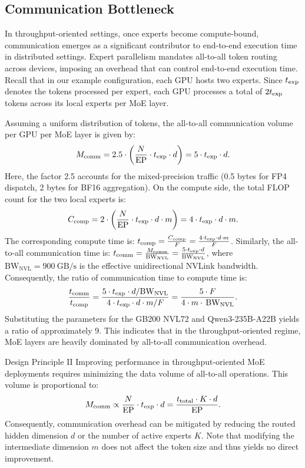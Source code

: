 \subsection{Communication Bottleneck}
In throughput-oriented settings, once experts become compute-bound, communication emerges as a significant contributor to end-to-end execution time in distributed settings. Expert parallelism mandates all-to-all token routing across devices, imposing an overhead that can control end-to-end execution time.
Recall that in our example configuration, each GPU hosts two experts. Since $t_\mathrm{exp}$ denotes the tokens processed per expert, each GPU processes a total of $2 t_\mathrm{exp}$ tokens across its local experts per MoE layer.

Assuming a uniform distribution of tokens, the all-to-all communication volume per GPU per MoE layer is given by:
\begin{equation*}
M_{\mathrm{comm}} = 2.5 \cdot \left( \frac{N}{\mathrm{EP}} \cdot t_\mathrm{exp} \cdot d \right) = 5 \cdot t_\mathrm{exp} \cdot d.
\end{equation*}
Here, the factor 2.5 accounts for the mixed-precision traffic (0.5 bytes for FP4 dispatch, 2 bytes for BF16 aggregation). On the compute side, the total FLOP count for the two local experts is:
\begin{equation*}
C_{\mathrm{comp}} = 2 \cdot \left( \frac{N}{\mathrm{EP}} \cdot t_\mathrm{exp} \cdot d \cdot m \right) = 4 \cdot t_\mathrm{exp} \cdot d \cdot m.
\end{equation*}
The corresponding compute time is: $t_{\mathrm{comp}} = \frac{C_{\mathrm{comp}}}{F} = \frac{4 \cdot t_\mathrm{exp} \cdot d \cdot m}{F}$. Similarly, the all-to-all communication time is:
$t_{\mathrm{comm}} = \frac{M_{\mathrm{comm}}}{\mathrm{BW}_{\mathrm{NVL}}} = \frac{5 \cdot t_\mathrm{exp} \cdot d}{\mathrm{BW}_{\mathrm{NVL}}}$,
where $\mathrm{BW}_{\mathrm{NVL}} = 900~\text{GB/s}$ is the effective unidirectional NVLink bandwidth. Consequently, the ratio of communication time to compute time is:
\begin{equation*}
\frac{t_{\mathrm{comm}}}{t_{\mathrm{comp}}} = \frac{5 \cdot t_\mathrm{exp} \cdot d / \mathrm{BW}_{\mathrm{NVL}}}{4 \cdot t_\mathrm{exp} \cdot d \cdot m / F} = \frac{5 \cdot F}{4 \cdot m \cdot \, \mathrm{BW}_{\mathrm{NVL}}}.
\end{equation*}
Substituting the parameters for the GB200 NVL72 and Qwen3-235B-A22B yields a ratio of approximately 9. This indicates that in the throughput-oriented regime, MoE layers are heavily dominated by all-to-all communication overhead.

\begin{notebox}{Design Principle II}
Improving performance in throughput-oriented MoE deployments requires minimizing the data volume of all-to-all operations. This volume is proportional to:
\begin{equation*}
M_{\mathrm{comm}} \propto \frac{N}{\mathrm{EP}} \cdot t_\mathrm{exp} \cdot d = \frac{t_\mathrm{total} \cdot K \cdot d}{\mathrm{EP}}.
\end{equation*}
Consequently, communication overhead can be mitigated by reducing the routed hidden dimension $d$ or the number of active experts $K$. Note that modifying the intermediate dimension $m$ does not affect the token size and thus yields no direct improvement.
\end{notebox}

